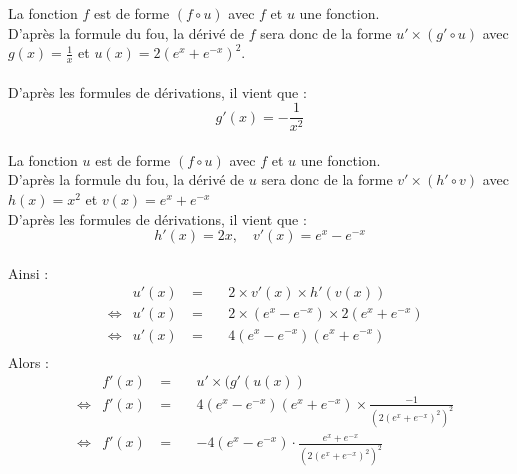 \documentclass[a4paper,fleqn]{article}
\date{\today}
\begin{document}
La fonction $f$ est de forme $(f \circ u)$ avec $f$ et $u$ une fonction. \\
D'après la formule du fou, la dérivé de $f$ sera donc de la forme $u'\times(g' \circ u)$ avec $g(x) = \frac{1}{x}$ et $u(x) = 2(e^x+e^{-x})^2$. \\ \\
D'après les formules de dérivations, il vient que :
$$ g'(x)=-\frac{1}{x^2} $$ \\
La fonction $u$ est de forme $(f \circ u)$ avec $f$ et $u$ une fonction. \\
D'après la formule du fou, la dérivé de $u$ sera donc de la forme $v'\times(h' \circ v)$ avec $h(x) = x^2$ et $v(x) = e^x+e^{-x}$ \\
D'après les formules de dérivations, il vient que :
$$h'(x) = 2x,\quad v'(x) = e^x-e^{-x} $$ \\
Ainsi :
\begin{align*}
	&               & u'(x) &~=~&& 2 \times v'(x) \times h'(v(x)) \\ 
	&\Leftrightarrow& u'(x) &~=~&& 2 \times (e^x-e^{-x}) \times 2(e^x+e^{-x}) \\
	&\Leftrightarrow& u'(x) &~=~&& 4(e^x-e^{-x})(e^x+e^{-x}) \\
\end{align*}
Alors :
\begin{align*}
	&               & f'(x) &~=~&& u'\times(g'(u(x)) \\
	&\Leftrightarrow& f'(x) &~=~&& 4(e^x-e^{-x})(e^x+e^{-x}) \times \frac{-1}{(2(e^x+e^{-x})^2)^2} \\ 
	&\Leftrightarrow& f'(x) &~=~&& -4(e^x-e^{-x}) \cdot \frac{e^x+e^{-x}}{(2(e^x+e^{-x})^2)^2} \\ 
\end{align*}
\end{document}

